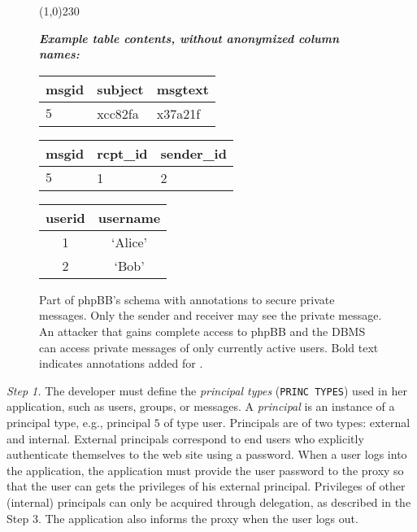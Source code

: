 \begin{figure}[t!]
\begin{framed}
\vspace{-5mm}
\line(1,0){230}
\vspace{-3mm}
\begin{center}
\textbf{\textit{Example table contents, without anonymized column names:}}
\end{center}
 \hspace{1mm}
 \begin{minipage}[h]{1.7 in}
  \centering
  \begin{tabular}{p{0.8cm}|p{1cm}|p{0.8cm}}
  msgid & subject & msgtext \\
  \hline
  $5$     & xcc82fa & x37a21f \\ 
  \end{tabular}
  \begin{tabular}{p{0.8cm}|p{1cm}|p{0.8cm}}
  msgid & rcpt\_id  & sender\_id \\
  \hline
  $5$     & 1 & 2 \\ 
  \end{tabular}
\end{minipage}
\hspace{0mm}
\begin{minipage}[h]{0.9in}
 \centering
  \begin{tabular}{c|c}
  userid & username \\
  \hline
  1     & `Alice'  \\  
  2 & `Bob' 
  \end{tabular}
 \end{minipage}
\end{framed}

\vspace{-0.2in}
\caption{
Part of phpBB's schema with annotations to secure private messages.
Only the sender and receiver may see the private message. An attacker
that gains complete access to phpBB and the DBMS can access
private messages of only currently active users.  Bold text indicates
annotations added for \name.
    }
\label{fig:privmsg}
\end{figure}

{\em Step 1.} The developer must define the {\em principal types}
({\small \tt PRINC TYPES}) used in her application, such as users,
groups, or messages.  A {\em principal} is an instance of a principal
type, e.g., principal $5$ of type user.  Principals are of two types:
external and internal. External principals correspond to end users who
explicitly authenticate themselves to the web site using a password.
When a user logs into the application, the application must provide
the user password to the \name proxy so that the user can gets the
privileges of his external principal.  Privileges of other (internal)
principals can only be acquired through delegation, as described in
the Step 3.  The application also informs the proxy when the user logs
out.


